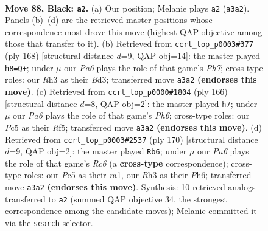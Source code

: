 \documentclass[11pt]{article}
\begin{document}
\clearpage

\begin{figure}[p]\centering
\begin{subfigure}{0.46\textwidth}\centering
\resizebox{\linewidth}{!}{%
\newchessgame
\chessboard[
  setfen={8/8/8/2p1k3/3p4/p6r/6K1/8 b - - 1 88},
  showmover=false,
  pgfstyle=straightmove, color=movearrow, markmove={a3-a2}
]}
\caption{}
\end{subfigure}\hfill
\begin{subfigure}{0.46\textwidth}\centering
\resizebox{\linewidth}{!}{%
\newchessgame
\chessboard[
  setfen={R7/7P/8/8/3k2P1/3B1P2/6K1/8 w - - 1 85},
  showmover=false,
  pgfstyle=straightmove, color=movearrow, markmove={h7-h8}
]}
\caption{}
\end{subfigure}
\\[4pt]
\begin{subfigure}{0.46\textwidth}\centering
\resizebox{\linewidth}{!}{%
\newchessgame
\chessboard[
  setfen={8/8/r6P/5R2/7k/5P2/5K2/8 w - - 3 84},
  showmover=false,
  pgfstyle=straightmove, color=movearrow, markmove={h6-h7}
]}
\caption{}
\end{subfigure}\hfill
\begin{subfigure}{0.46\textwidth}\centering
\resizebox{\linewidth}{!}{%
\newchessgame
\chessboard[
  setfen={8/7k/2R4P/4KP2/8/8/8/r7 w - - 51 86},
  showmover=false,
  pgfstyle=straightmove, color=movearrow, markmove={c6-b6}
]}
\caption{}
\end{subfigure}
\caption{\textbf{Move 88, Black: \texttt{a2}.} (a) Our position; Melanie plays \texttt{a2} (\texttt{a3a2}). Panels (b)--(d) are the retrieved master positions whose correspondence most drove this move (highest QAP objective among those that transfer to it). (b) Retrieved from \texttt{ccrl\_top\_p0003\#377} (ply 168) [structural distance $d$=9, QAP obj=14]: the master played \texttt{h8=Q+}; under $\mu$ our \emph{Pa6} plays the role of that game's \emph{Ph7}; cross-type roles: our \emph{R}h3 as their \emph{B}d3; transferred move \texttt{a3a2} \textbf{(endorses this move)}. (c) Retrieved from \texttt{ccrl\_top\_p0000\#1804} (ply 166) [structural distance $d$=8, QAP obj=2]: the master played \texttt{h7}; under $\mu$ our \emph{Pa6} plays the role of that game's \emph{Ph6}; cross-type roles: our \emph{P}c5 as their \emph{R}f5; transferred move \texttt{a3a2} \textbf{(endorses this move)}. (d) Retrieved from \texttt{ccrl\_top\_p0003\#2537} (ply 170) [structural distance $d$=9, QAP obj=2]: the master played \texttt{Rb6}; under $\mu$ our \emph{Pa6} plays the role of that game's \emph{Rc6} (a \textbf{cross-type} correspondence); cross-type roles: our \emph{P}c5 as their \emph{r}a1, our \emph{R}h3 as their \emph{P}h6; transferred move \texttt{a3a2} \textbf{(endorses this move)}. Synthesis: 10 retrieved analogs transferred to \texttt{a2} (summed QAP objective 34, the strongest correspondence among the candidate moves); Melanie committed it via the \texttt{search} selector.}
\label{fig:thought-m175}
\end{figure}
\end{document}
